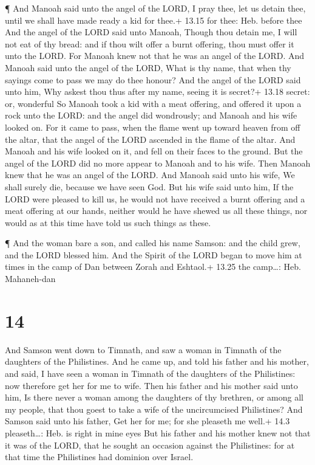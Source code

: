  ¶ And Manoah said unto the angel of the LORD, I pray thee,
let us detain thee, until we shall have made ready a kid for thee.+
13.15 for thee: Heb. before thee  And the angel of the LORD
said unto Manoah, Though thou detain me, I will not eat of thy bread:
and if thou wilt offer a burnt offering, thou must offer it unto the
LORD. For Manoah knew not that he was an angel of the LORD.
 And Manoah said unto the angel of the LORD, What is thy
name, that when thy sayings come to pass we may do thee honour?
 And the angel of the LORD said unto him, Why askest thou
thus after my name, seeing it is secret?+ 13.18 secret: or, wonderful
 So Manoah took a kid with a meat offering, and offered it
upon a rock unto the LORD: and the angel did wondrously; and Manoah and
his wife looked on.  For it came to pass, when the flame
went up toward heaven from off the altar, that the angel of the LORD
ascended in the flame of the altar. And Manoah and his wife looked on
it, and fell on their faces to the ground.  But the angel
of the LORD did no more appear to Manoah and to his wife. Then Manoah
knew that he was an angel of the LORD.  And Manoah said
unto his wife, We shall surely die, because we have seen God.
 But his wife said unto him, If the LORD were pleased to
kill us, he would not have received a burnt offering and a meat offering
at our hands, neither would he have shewed us all these things, nor
would as at this time have told us such things as these.

 ¶ And the woman bare a son, and called his name Samson:
and the child grew, and the LORD blessed him.  And the
Spirit of the LORD began to move him at times in the camp of Dan between
Zorah and Eshtaol.+ 13.25 the camp\ldots: Heb. Mahaneh-dan

\hypertarget{section-13}{%
\section{14}\label{section-13}}

 And Samson went down to Timnath, and saw a woman in Timnath
of the daughters of the Philistines.  And he came up, and
told his father and his mother, and said, I have seen a woman in Timnath
of the daughters of the Philistines: now therefore get her for me to
wife.  Then his father and his mother said unto him, Is
there never a woman among the daughters of thy brethren, or among all my
people, that thou goest to take a wife of the uncircumcised Philistines?
And Samson said unto his father, Get her for me; for she pleaseth me
well.+ 14.3 pleaseth\ldots: Heb. is right in mine eyes  But
his father and his mother knew not that it was of the LORD, that he
sought an occasion against the Philistines: for at that time the
Philistines had dominion over Israel.

